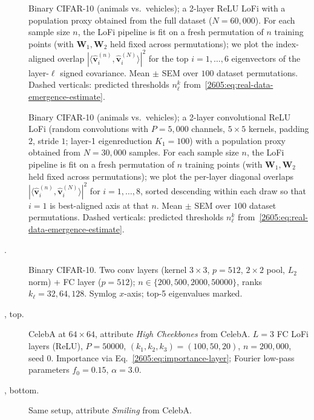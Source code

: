 \begin{description}
  \item[]
    Binary CIFAR-10 (animals vs.\ vehicles); a 2-layer ReLU LoFi with a
    population proxy obtained from the full dataset ($N=60{,}000$).
    For each sample size $n$, the LoFi pipeline is fit on a fresh
    permutation of $n$ training points (with $\bm W_1,\bm W_2$ held fixed
    across permutations); we plot the index-aligned overlap
    $|\langle\hat{\bm v}_i^{(n)},\hat{\bm v}_i^{(N)}\rangle|^2$ for the top
    $i=1,\dots,6$ eigenvectors of the layer-$\ell$ signed covariance. Mean
    $\pm$ SEM over $100$ dataset permutations. Dashed verticals: predicted
    thresholds $n_\ell^k$ from~\cref{2605:eq:real-data-emergence-estimate}.

  \item[]
      Binary CIFAR-10 (animals vs.\ vehicles); a 2-layer convolutional ReLU LoFi (random convolutions with $P=5{,}000$ channels, $5{\times}5$ kernels, padding $2$, stride $1$; layer-1 eigenreduction $K_1=100$) with a population proxy obtained from $N=30{,}000$ samples. For each sample size $n$, the LoFi pipeline is fit on a fresh permutation of $n$ training points (with $\bm W_1,\bm W_2$ held fixed across permutations); we plot the per-layer diagonal overlaps $|\langle\hat{\bm v}_i^{(n)},\hat{\bm v}_i^{(N)}\rangle|^2$ for $i=1,\dots,8$, sorted descending within each draw so that $i=1$ is best-aligned axis at that $n$. Mean $\pm$ SEM over $100$ dataset permutations. Dashed verticals: predicted thresholds $n_\ell^k$ from~\cref{2605:eq:real-data-emergence-estimate}.

  \item[.]
    Binary CIFAR-10. Two conv layers (kernel $3\times3$, $p=512$, $2{\times}2$
    pool, $L_2$ norm) + FC layer ($p=512$); $n\in\{200,500,2000,50000\}$,
    ranks $k_\ell=32,64,128$. Symlog $x$-axis; top-5 eigenvalues marked.

  \item[, top.]
    CelebA at $64{\times}64$, attribute \emph{High Cheekbones} from CelebA.
    $L=3$ FC LoFi layers (ReLU), $P=50000$, $(k_1, k_2, k_3) = (100,50,20)$,
    $n=200{,}000$, seed $0$. Importance via Eq.~\eqref{2605:eq:importance-layer}; Fourier low-pass parameters $f_0=0.15$, $\alpha=3.0$.

  \item[, bottom.]
    Same setup, attribute \emph{Smiling} from CelebA.


\end{description}
